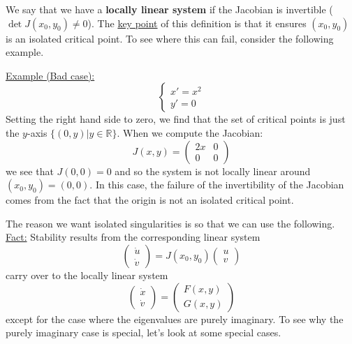 \documentclass[11pt, letterpaper, oneside]{article}     %
\numberwithin{equation}{subsection}
\theoremstyle{definition}
\numberwithin{theorem}{section}
\theoremstyle{remark}
\newcommand{\RR}{\mathbb{R}}
\begin{document}
\begin{enumerate}
  We say that we have a \textbf{locally linear system} if the Jacobian is invertible ($\det J(x_0,y_0) \neq 0$). The \underline{key point} of this definition is that it ensures $(x_0,y_0)$ is an isolated critical point. To see where this can fail, consider the following example.

  \underline{Example (Bad case):}
  \begin{equation}
    \begin{cases}
      x' = x^2\\
      y' = 0
    \end{cases}
  \end{equation}
  Setting the right hand side to zero, we find that the set of critical points is just the $y$-axis $\{(0,y)|y \in \RR\}$. When we compute the Jacobian:
  \begin{equation}
    J(x,y) =
    \begin{pmatrix}
      2x & 0\\
      0 & 0
    \end{pmatrix}
  \end{equation}
  we see that $J(0,0) = 0$ and so the system is not locally linear around $(x_0,y_0) = (0,0)$. In this case, the failure of the invertibility of the Jacobian comes from the fact that the origin is not an isolated critical point.

  \medskip
  The reason we want isolated singularities is so that we can use the following.\\
  \underline{Fact:} Stability results from the corresponding linear system
  \begin{equation}
    \begin{pmatrix}
      \dot u \\ \dot v
    \end{pmatrix}
    =
    J(x_0,y_0)
    \begin{pmatrix}
      u \\ v
    \end{pmatrix}
  \end{equation}
  carry over to the locally linear system
  \begin{equation}
    \begin{pmatrix}
      \dot x \\ \dot v
    \end{pmatrix}
    =
    \begin{pmatrix}
      F(x,y) \\ G(x,y)
    \end{pmatrix}
  \end{equation}
  except for the case where the eigenvalues are purely imaginary. To see why the purely imaginary case is special, let's look at some special cases.


\end{enumerate}
\end{document}
